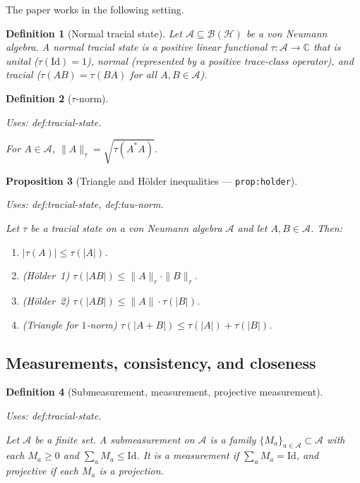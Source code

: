 \documentclass{article}
\providecommand{\uses}[1]{\par\smallskip\noindent\emph{Uses:} #1.\par\smallskip}
\newtheorem{definition}{Definition}[section]
\newtheorem{proposition}[definition]{Proposition}
\theoremstyle{remark}
\newcommand{\C}{\mathbb{C}}
\newcommand{\id}{\mathrm{Id}}
\newcommand{\hilb}{\mathcal{H}}
\newcommand{\algebra}{\mathcal{A}}
\begin{document}
The paper works in the following setting.

\begin{definition}[Normal tracial state]\label{def:tracial-state}
	Let $\algebra\subseteq\mathcal{B}(\hilb)$ be a von Neumann algebra.
	A \emph{normal tracial state} is a positive linear functional
	$\tau\colon\algebra\to\C$ that is unital ($\tau(\id)=1$),
	normal (represented by a positive trace-class operator),
	and tracial ($\tau(AB)=\tau(BA)$ for all $A,B\in\algebra$).
\end{definition}

\begin{definition}[$\tau$-norm]\label{def:tau-norm}
	\uses{def:tracial-state}
	For $A\in\algebra$,
	$\|A\|_\tau = \sqrt{\tau(A^*A)}$.
\end{definition}

\begin{proposition}[Triangle and H\"older inequalities --- \texttt{prop:holder}]
	\label{prop:holder}
	\uses{def:tracial-state, def:tau-norm}
	Let $\tau$ be a tracial state on a von Neumann algebra $\algebra$
	and let $A,B\in\algebra$. Then:
	\begin{enumerate}[label=(\roman*)]
		\item\label{item:holder-0} $|\tau(A)|\le\tau(|A|)$.
		\item\label{item:holder-1} (H\"older~1) $\tau(|AB|)\le\|A\|_\tau\cdot\|B\|_\tau$.
		\item\label{item:holder-2} (H\"older~2) $\tau(|AB|)\le\|A\|\cdot\tau(|B|)$.
		\item\label{item:triangle} (Triangle for $1$-norm) $\tau(|A+B|)\le\tau(|A|)+\tau(|B|)$.
	\end{enumerate}
\end{proposition}

\subsection{Measurements, consistency, and closeness}

\begin{definition}[Submeasurement, measurement, projective measurement]\label{def:submeasurement}
	\uses{def:tracial-state}
	Let $\mathcal{A}$ be a finite set.
	A \emph{submeasurement} on $\mathcal{A}$ is a family
	$\{M_a\}_{a\in\mathcal{A}}\subset\algebra$ with each $M_a\ge 0$ and
	$\sum_a M_a\le\id$.
	It is a \emph{measurement} if $\sum_a M_a=\id$,
	and \emph{projective} if each $M_a$ is a projection.
\end{definition}
\end{document}
